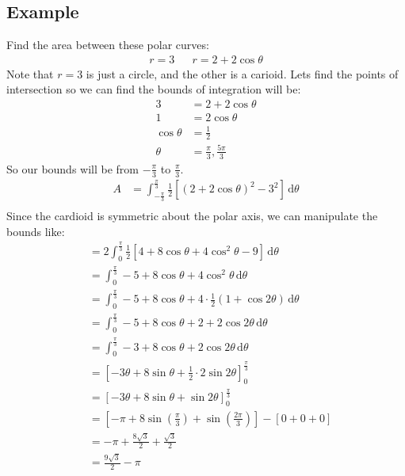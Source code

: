 \documentclass{report}
\begin{document}
    \subsection{Example}
        Find the area between these polar curves:
        \begin{align*}
            r = 3 &&
            r = 2 + 2 \cos \theta
        \end{align*}
        Note that \(r = 3\) is just a circle, and the other is a carioid.
        Lets find the points of intersection so we can find the bounds of integration will be:
        \begin{align*}
            3 &= 2 + 2 \cos \theta \\
            1 &= 2 \cos \theta \\
            \cos \theta &= \frac{1}{2} \\
            \theta &= \frac{\pi}{3}, \frac{5 \pi}{3}
        \end{align*}
        So our bounds will be from \(- \frac{\pi}{3}\) to \(\frac{\pi}{3}\).
        \begin{align*}
            A &= \int_{- \frac{\pi}{3}}^{\frac{\pi}{3}} \frac{1}{2} \left[(2+2 \cos \theta)^2 - 3^2\right] \, \mathrm{d} \theta \\
        \end{align*}
        Since the cardioid is symmetric about the polar axis, we can manipulate the bounds like:
        \begin{align*}
            &= 2 \int_{0}^{\frac{\pi}{3}} \frac{1}{2} \left[ 4 + 8 \cos \theta + 4 \cos^2 \theta - 9 \right] \, \mathrm{d} \theta \\
            &= \int_{0}^{\frac{\pi}{3}} -5 + 8 \cos \theta + 4 \cos^2 \theta \, \mathrm{d} \theta \\
            &= \int_{0}^{\frac{\pi}{3}} -5 + 8 \cos \theta + 4 \cdot \frac{1}{2} (1 + \cos 2 \theta) \, \mathrm{d} \theta \\
            &= \int_{0}^{\frac{\pi}{3}} -5 + 8 \cos \theta + 2 + 2 \cos 2 \theta \, \mathrm{d} \theta \\
            &= \int_{0}^{\frac{\pi}{3}} -3 + 8 \cos \theta + 2 \cos 2 \theta \, \mathrm{d} \theta \\
            &= \left[-3 \theta + 8 \sin \theta + \frac{1}{2} \cdot 2 \sin 2 \theta \right]_0^{\frac{\pi}{3}} \\
            &= \left[-3 \theta + 8 \sin \theta + \sin 2 \theta \right]_0^{\frac{\pi}{3}} \\
            &= \left[ -\pi + 8 \sin (\frac{\pi}{3}) + \sin (\frac{2 \pi}{3})\right] - \left[ 0 + 0 + 0 \right] \\
            &= - \pi + \frac{8 \sqrt{3}}{2} + \frac{\sqrt{3}}{2} \\
            &= \frac{9 \sqrt{3}}{2} - \pi
        \end{align*}
        
\end{document}
